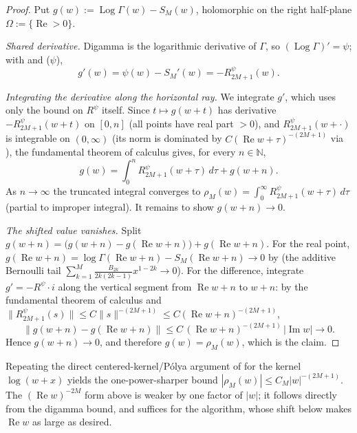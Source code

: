 \begin{proof}
\leanok
{}
Put $g(w):=\operatorname{Log}\Gamma(w)-S_M(w)$, holomorphic on the right half-plane
$\Omega:=\{\operatorname{Re}>0\}$.

\emph{Shared derivative.} Digamma is the logarithmic derivative of $\Gamma$, so
$(\operatorname{Log}\Gamma)'=\psi$; with  and \textup{($\psi$)},
\[
  g'(w)=\psi(w)-S_M'(w)=-R^{\psi}_{2M+1}(w).
\]

\emph{Integrating the derivative along the horizontal ray.} We integrate $g'$, which uses
only the bound on $R^{\psi}$ itself. Since $t\mapsto g(w+t)$ has derivative $-R^{\psi}_{2M+1}(w+t)$ on $[0,n]$ (all
points have real part $>0$), and $R^{\psi}_{2M+1}(w+\cdot)$ is integrable on $(0,\infty)$ (its norm
is dominated by $C(\operatorname{Re}w+\tau)^{-(2M+1)}$ via ), the
fundamental theorem of calculus gives, for every $n\in\mathbb{N}$,
\[
  g(w)=\int_0^n R^{\psi}_{2M+1}(w+\tau)\,d\tau+g(w+n).
\]
As $n\to\infty$ the truncated integral converges to $\rho_M(w)=\int_0^\infty R^{\psi}_{2M+1}(w+\tau)\,d\tau$
(partial to improper integral). It remains to show $g(w+n)\to0$.

\emph{The shifted value vanishes.} Split
$g(w+n)=\bigl(g(w+n)-g(\operatorname{Re}w+n)\bigr)+g(\operatorname{Re}w+n)$. For the real point,
$g(\operatorname{Re}w+n)=\log\Gamma(\operatorname{Re}w+n)-S_M(\operatorname{Re}w+n)\to0$ by
 (the additive Bernoulli tail $\sum_{k=1}^{M}\tfrac{B_{2k}}{2k(2k-1)}x^{1-2k}\to0$).
For the difference, integrate $g'=-R^{\psi}\cdot i$ along the vertical segment from
$\operatorname{Re}w+n$ to $w+n$: by the fundamental theorem of calculus and
$\|R^{\psi}_{2M+1}(s)\|\le C\|s\|^{-(2M+1)}\le C(\operatorname{Re}w+n)^{-(2M+1)}$,
\[
  \bigl\|g(w+n)-g(\operatorname{Re}w+n)\bigr\|
  \le C\,(\operatorname{Re}w+n)^{-(2M+1)}\,\lvert\operatorname{Im}w\rvert\longrightarrow0.
\]
Hence $g(w+n)\to0$, and therefore $g(w)=\rho_M(w)$, which is the claim.
\end{proof}

\begin{remark}
\label{rem:hz_sharp}
Repeating the direct centered-kernel/P\'olya argument of 
for the kernel $\log(w+x)$ yields the
one-power-sharper bound $|\rho_M(w)|\le C_M\lvert w\rvert^{-(2M+1)}$. The
$(\operatorname{Re}w)^{-2M}$ form above is weaker by one factor of $|w|$; it follows
directly from the digamma bound, and suffices for
the algorithm, whose shift below makes $\operatorname{Re}w$ as large as desired.
\end{remark}

